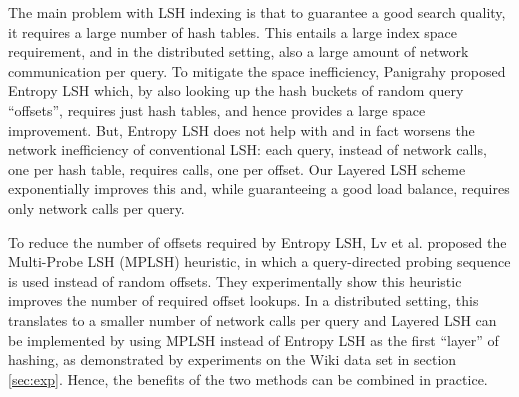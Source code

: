 \documentclass{acm_proc_article-sp}
\numberwithin{equation}{section}
\numberwithin{figure}{section}
\newcommand{\comment}[1]{}
\begin{document}
The main problem with LSH indexing is that to guarantee a good search quality, it requires a large number of hash tables. This entails a large index space requirement, and in the distributed setting, also a large amount of network communication per query. To mitigate the space inefficiency, Panigrahy \cite{P06} proposed Entropy LSH which, by also looking up the hash buckets of  random query ``offsets'', requires just  hash tables, and hence provides a large space improvement. But, Entropy LSH does not help with and in fact worsens the network inefficiency of conventional LSH: each query, instead of  network calls, one per hash table, requires  calls, one per offset. Our Layered LSH scheme exponentially improves this and, while guaranteeing a good load balance, requires only  network calls per query.

To reduce the number of offsets required by Entropy LSH, Lv et al. \cite{Charikar:multiprobe} proposed the Multi-Probe LSH (MPLSH) heuristic, in which a query-directed probing sequence is used instead of random offsets. They experimentally show this heuristic improves the number of required offset lookups. In a distributed setting, this translates to a smaller number of network calls per query and Layered LSH can be implemented by using MPLSH instead of Entropy LSH as the first ``layer'' of hashing, as demonstrated by experiments on the Wiki data set in section \ref{sec:exp}. Hence, the benefits of the two methods can be combined in practice.

\comment{
To reduce the number of offsets required by Entropy LSH, Lv et al. \cite{Charikar:multiprobe} proposed the Multi-Probe LSH (MPLSH) heuristic, in which a query-directed probing sequence is used instead of random offsets. They experimentally show this heuristic improves the number of required offset lookups. In a distributed setting, this translates to a smaller number of network calls per query, which is the main goal in Layered LSH as well. Clearly, Layered LSH can be implemented by using MPLSH instead of Entropy LSH as the first ``layer'' of hashing. Hence, the benefits of the two methods can be combined in practice, as demonstrated by experiments on the Wiki data set in section \ref{sec:exp}. However, the experiments by Lv et al. \cite{Charikar:multiprobe} show a modest constant factor reduction in the number of offsets compared to Entropy LSH. Hence, since Layered LSH, besides a theoretical exponential improvement, experimentally shows a factor  reduction in network load compared to Entropy LSH, it is not clear if the marginal benefit from switching the first layer to MPLSH is significant enough to justify its much more complicated offset generation. Furthermore, MPLSH has no theoretical guarantees, while using Entropy LSH as the first layer of hashing allows for the strong theoretical guarantees on both network cost and load balance of Layered LSH proved in this paper. Hence overall, in this paper, we focus on Entropy LSH as the first layer of hashing in Layered LSH.}
\end{document}
